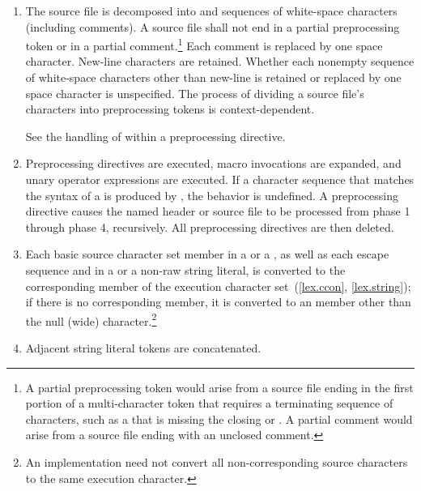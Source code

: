 \begin{enumerate}
\item The source file is decomposed into  and sequences of white-space characters
(including comments). A source file shall not end in a partial
preprocessing token or in a partial comment.\footnote{A partial preprocessing
token would arise from a source file
ending in the first portion of a multi-character token that requires a
terminating sequence of characters, such as a 
that is missing the closing 
or \tcode{>}. A partial comment
would arise from a source file ending with an unclosed \tcode{/*}
comment.}
Each comment is replaced by one space character. New-line characters are
retained. Whether each nonempty sequence of white-space characters other
than new-line is retained or replaced by one space character is
unspecified. The process of dividing a source file's
characters into preprocessing tokens is context-dependent.
\begin{example}
See the handling of \tcode{<} within a  preprocessing
directive.
\end{example}

\item Preprocessing directives are executed, macro invocations are
expanded, and  unary operator expressions are executed.
If a character sequence that matches the syntax of a
 is produced by , the behavior is undefined. A
 preprocessing directive causes the named header or
source file to be processed from phase 1 through phase 4, recursively.
All preprocessing directives are then deleted.

\item Each basic source character set member in a  or a
, as well as each escape sequence and  in a
 or a non-raw string literal, is converted to the corresponding
member of the execution character set~(\ref{lex.ccon}, \ref{lex.string}); if
there is no corresponding member, it is converted to an  member other
than the null (wide) character.\footnote{An implementation need not convert all
non-corresponding source characters to the same execution character.}

\item Adjacent string literal tokens are concatenated.


\end{enumerate}
